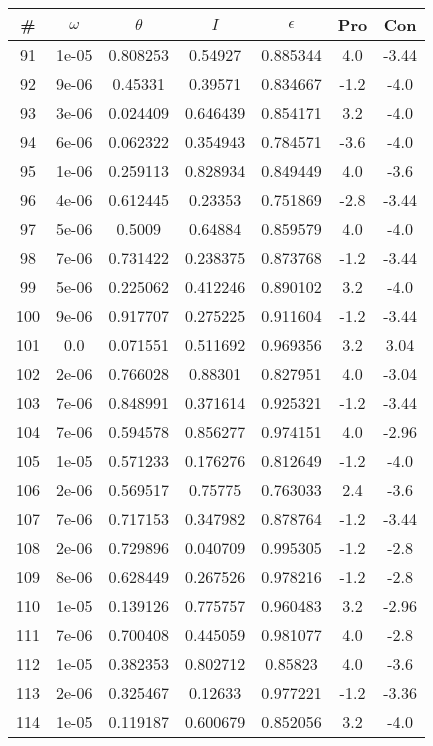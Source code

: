 \begin{table}
\begin{tabular}{c|c|c|c|c|c|c}
\# & $\omega$ & $\theta$ & $I$ & $\epsilon$ & Pro & Con\\
\hline
91 & 1e-05 & 0.808253 & 0.54927 & 0.885344 & 4.0 & -3.44\\
92 & 9e-06 & 0.45331 & 0.39571 & 0.834667 & -1.2 & -4.0\\
93 & 3e-06 & 0.024409 & 0.646439 & 0.854171 & 3.2 & -4.0\\
94 & 6e-06 & 0.062322 & 0.354943 & 0.784571 & -3.6 & -4.0\\
95 & 1e-06 & 0.259113 & 0.828934 & 0.849449 & 4.0 & -3.6\\
96 & 4e-06 & 0.612445 & 0.23353 & 0.751869 & -2.8 & -3.44\\
97 & 5e-06 & 0.5009 & 0.64884 & 0.859579 & 4.0 & -4.0\\
98 & 7e-06 & 0.731422 & 0.238375 & 0.873768 & -1.2 & -3.44\\
99 & 5e-06 & 0.225062 & 0.412246 & 0.890102 & 3.2 & -4.0\\
100 & 9e-06 & 0.917707 & 0.275225 & 0.911604 & -1.2 & -3.44\\
101 & 0.0 & 0.071551 & 0.511692 & 0.969356 & 3.2 & 3.04\\
102 & 2e-06 & 0.766028 & 0.88301 & 0.827951 & 4.0 & -3.04\\
103 & 7e-06 & 0.848991 & 0.371614 & 0.925321 & -1.2 & -3.44\\
104 & 7e-06 & 0.594578 & 0.856277 & 0.974151 & 4.0 & -2.96\\
105 & 1e-05 & 0.571233 & 0.176276 & 0.812649 & -1.2 & -4.0\\
106 & 2e-06 & 0.569517 & 0.75775 & 0.763033 & 2.4 & -3.6\\
107 & 7e-06 & 0.717153 & 0.347982 & 0.878764 & -1.2 & -3.44\\
108 & 2e-06 & 0.729896 & 0.040709 & 0.995305 & -1.2 & -2.8\\
109 & 8e-06 & 0.628449 & 0.267526 & 0.978216 & -1.2 & -2.8\\
110 & 1e-05 & 0.139126 & 0.775757 & 0.960483 & 3.2 & -2.96\\
111 & 7e-06 & 0.700408 & 0.445059 & 0.981077 & 4.0 & -2.8\\
112 & 1e-05 & 0.382353 & 0.802712 & 0.85823 & 4.0 & -3.6\\
113 & 2e-06 & 0.325467 & 0.12633 & 0.977221 & -1.2 & -3.36\\
114 & 1e-05 & 0.119187 & 0.600679 & 0.852056 & 3.2 & -4.0\\

\end{tabular}
\end{table}
